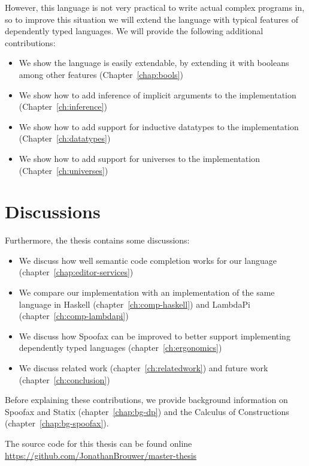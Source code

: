 However, this language is not very practical to write actual complex programs in, so to improve this situation we will extend the language with typical features of dependently typed languages. We will provide the following additional contributions:
\begin{itemize}
	\item We show the language is easily extendable, by extending it with booleans among other features (Chapter~\ref{chap:bools})
	\item We show how to add inference of implicit arguments to the implementation (Chapter~\ref{ch:inference})
	\item We show how to add support for inductive datatypes to the implementation (Chapter~\ref{ch:datatypes})
	\item We show how to add support for universes to the implementation (Chapter~\ref{ch:universes})
\end{itemize}

\section*{Discussions}

Furthermore, the thesis contains some discussions:
\begin{itemize}
	\item We discuss how well semantic code completion works for our language (chapter~\ref{chap:editor-services})
	\item We compare our implementation with an implementation of the same language in Haskell (chapter~\ref{ch:comp-haskell}) and LambdaPi (chapter~\ref{ch:comp-lambdapi})
	\item We discuss how Spoofax can be improved to better support implementing dependently typed languages (chapter~\ref{ch:ergonomics})
	\item We discuss related work (chapter~\ref{ch:relatedwork}) and future work (chapter~\ref{ch:conclusion})
\end{itemize}

\noindent Before explaining these contributions, we provide background information on Spoofax and Statix (chapter~\ref{chap:bg-dp}) and the Calculus of Constructions (chapter~\ref{chap:bg-spoofax}).

The source code for this thesis can be found online \\ \url{https://github.com/JonathanBrouwer/master-thesis}

